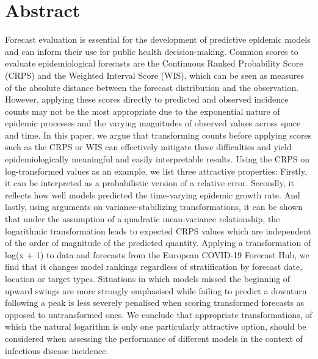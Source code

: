 \documentclass[10pt,letterpaper]{article}
\begin{document}
\section*{Abstract}
Forecast evaluation is essential for the development of predictive epidemic models and can inform their use for public health decision-making. Common scores to evaluate epidemiological forecasts are the Continuous Ranked Probability Score (CRPS) and the Weighted Interval Score (WIS), which can be seen as measures of the absolute distance between the forecast distribution and the observation. However, applying these scores directly to predicted and observed incidence counts may not be the most appropriate due to the exponential nature of epidemic processes and the varying magnitudes of observed values across space and time. In this paper, we argue that transforming counts before applying scores such as the CRPS or WIS can effectively mitigate these difficulties and yield epidemiologically meaningful and easily interpretable results. Using the CRPS on log-transformed values as an example, we list three attractive properties: Firstly, it can be interpreted as a probabilistic version of a relative error. Secondly, it reflects how well models predicted the time-varying epidemic growth rate. And lastly, using arguments on variance-stabilizing transformations, it can be shown that under the assumption of a quadratic mean-variance relationship, the logarithmic transformation leads to expected CRPS values which are independent of the order of magnitude of the predicted quantity. Applying a transformation of log(x + 1) to data and forecasts from the European COVID-19 Forecast Hub, we find that it changes model rankings regardless of stratification by forecast date, location or target types. Situations in which models missed the beginning of upward swings are more strongly emphasised while failing to predict a downturn following a peak is less severely penalised when scoring transformed forecasts as opposed to untransformed ones. We conclude that appropriate transformations, of which the natural logarithm is only one particularly attractive option, should be considered when assessing the performance of different models in the context of infectious disease incidence.


\end{document}
